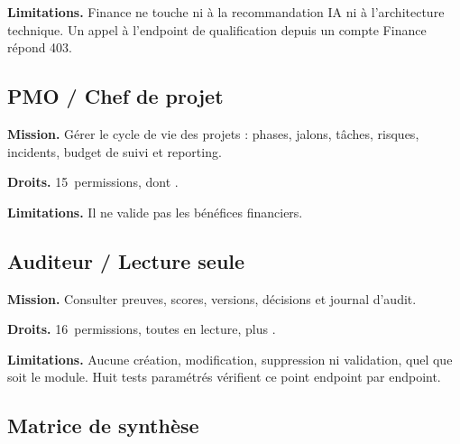 \textbf{Limitations.} Finance ne touche ni à la recommandation IA ni à l'architecture
technique. Un appel à l'endpoint de qualification depuis un compte Finance répond 403.

\subsection{PMO / Chef de projet}

\textbf{Mission.} Gérer le cycle de vie des projets : phases, jalons, tâches, risques,
incidents, budget de suivi et reporting.

\textbf{Droits.} 15~permissions, dont .

\textbf{Limitations.} Il ne valide pas les bénéfices financiers.

\subsection{Auditeur / Lecture seule}

\textbf{Mission.} Consulter preuves, scores, versions, décisions et journal d'audit.

\textbf{Droits.} 16~permissions, toutes en lecture, plus .

\textbf{Limitations.} Aucune création, modification, suppression ni validation, quel que
soit le module. Huit tests paramétrés vérifient ce point endpoint par endpoint.

\subsection{Matrice de synthèse}

